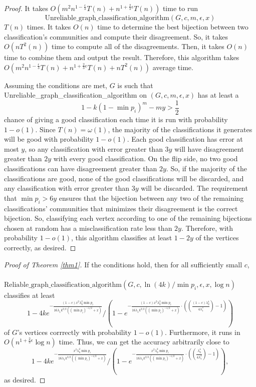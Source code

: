 \documentclass[11pt]{article}
\newcommand{\1}{\mathbb{1}}
\begin{document}
\begin{proof}
It takes $O(m^2 n^{1-\frac{\epsilon}{3}}T(n)+n^{1+\frac{2}{3}\epsilon}T(n))$ time to run $$\text{Unreliable\_graph\_classification\_algorithm}(G,c,m,\epsilon,x)$$ $T(n)$ times. It takes $O(n)$ time to determine the best bijection between two classification's communities and compute their disagreement. So, it takes $O(nT^2(n))$ time to compute all of the disagreements. Then, it takes $O(n)$ time to combine them and output the result. Therefore, this algorithm takes $O(m^2 n^{1-\frac{\epsilon}{3}}T(n)+n^{1+\frac{2}{3}\epsilon}T(n)+nT^2(n))$ average time.

Assuming the conditions are met, $G$ is such that Unreliable\_graph\_classification\_algorithm on $(G,c,m,\epsilon,x)$ has at least a \[1-k(1-\min p_i)^m-my>\frac{1}{2}\] chance of giving a good classification each time it is run with probability $1-o(1)$. Since $T(n)=\omega(1)$, the majority of the classifications it generates will be good with probability $1-o(1)$. Each good classification has error at most $y$, so any classification with error greater than $3y$ will have disagreement greater than $2y$ with every good classification. On the flip side, no two good classifications can have disagreement greater than $2y$. So, if the majority of the classifications are good, none of the good classifications will be discarded, and any classification with error greater than $3y$ will be discarded.  The requirement that $\min p_i>6y$ ensures that the bijection between any two of the remaining classifications' communities that minimizes their disagreement is the correct bijection. So, classifying each vertex according to one of the remaining bijections chosen at random has a misclassification rate less than $2y$. Therefore, with probability $1-o(1)$, this algorithm classifies at least $1-2y$ of the vertices correctly, as desired.
\end{proof}


\begin{proof}[Proof of Theorem \ref{thm1}]
If the conditions hold, then for all sufficiently small $c$, $\phantom{xxxxxxxxxxxxxxx}$ $\text{Reliable\_graph\_classification\_algorithm}(G,c,\ln(4k)/\min p_i,\epsilon,x,\log n)$ classifies at least  $$1-4ke^{-\frac{(1-c)x^2\lambda_{\eta}^2\min p_i}{16\lambda_1k^{3/2}((\min p_i)^{-1/2}+x)}}/(1-e^{-\frac{(1-c)x^2\lambda_{\eta}^2\min p_i}{16\lambda_1k^{3/2}((\min p_i)^{-1/2}+x)}\cdot((\frac{(1-c)\lambda_{\eta}^4}{4\lambda_1^3})-1)})$$ of $G$'s vertices corrrectly with probability $1-o(1)$. Furthermore, it runs in $O(n^{1+\frac{2}{3}\epsilon}\log n)$ time. Thus, we can get the accuracy arbitrarily close to $$1-4ke^{-\frac{x^2\lambda_{\eta}^2\min p_i}{16\lambda_1k^{3/2}((\min p_i)^{-1/2}+x)}}/(1-e^{-\frac{x^2\lambda_{\eta}^2\min p_i}{16\lambda_1k^{3/2}((\min p_i)^{-1/2}+x)}\cdot((\frac{\lambda_{\eta}^4}{4\lambda_1^3})-1)}),$$ as desired.
\end{proof}
\end{document}
